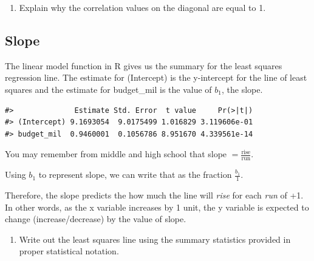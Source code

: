 \documentclass[
]{report}
\newenvironment{Shaded}{\begin{snugshade}}{\end{snugshade}}
\newcommand{\CommentTok}[1]{\textcolor[rgb]{0.56,0.35,0.01}{\textit{#1}}}
\newcommand{\DataTypeTok}[1]{\textcolor[rgb]{0.13,0.29,0.53}{#1}}
\newcommand{\KeywordTok}[1]{\textcolor[rgb]{0.13,0.29,0.53}{\textbf{#1}}}
\newcommand{\NormalTok}[1]{#1}
\newcommand{\OperatorTok}[1]{\textcolor[rgb]{0.81,0.36,0.00}{\textbf{#1}}}
\newcommand{\StringTok}[1]{\textcolor[rgb]{0.31,0.60,0.02}{#1}}
\providecommand{\tightlist}{%
  \setlength{\itemsep}{0pt}\setlength{\parskip}{0pt}}
\begin{document}
\begin{enumerate}
\def\labelenumi{\arabic{enumi}.}
\setcounter{enumi}{8}
\tightlist
\item
  Explain why the correlation values on the diagonal are equal to 1.
\end{enumerate}

\vspace{1in}

\newpage

\hypertarget{slope}{%
\subsection{Slope}\label{slope}}

The linear model function in R gives us the summary for the least squares regression line. The estimate for (Intercept) is the y-intercept for the line of least squares and the estimate for budget\_mil is the value of \(b_1\), the slope.

\begin{Shaded}
\end{Shaded}

\begin{verbatim}
#>              Estimate Std. Error  t value     Pr(>|t|)
#> (Intercept) 9.1693054  9.0175499 1.016829 3.119606e-01
#> budget_mil  0.9460001  0.1056786 8.951670 4.339561e-14
\end{verbatim}

You may remember from middle and high school that slope \(=\frac{\mbox{rise}}{\mbox{run}}\).

Using \(b_1\) to represent slope, we can write that as the fraction \(\frac{b_1}{1}\).

Therefore, the slope predicts the how much the line will \emph{rise} for each \emph{run} of +1. In other words, as the x variable increases by 1 unit, the y variable is expected to change (increase/decrease) by the value of slope.

\begin{enumerate}
\def\labelenumi{\arabic{enumi}.}
\setcounter{enumi}{9}
\tightlist
\item
  Write out the least squares line using the summary statistics provided in proper statistical notation.
\end{enumerate}
\end{document}
